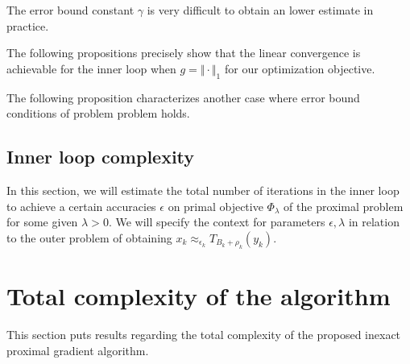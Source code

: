 \documentclass[12pt]{article}
\begin{document}
        \begin{remark}
            The error bound constant $\gamma$ is very difficult to obtain an lower estimate in practice. 
        \end{remark}
        \par
        The following propositions precisely show that the linear convergence is achievable for the inner loop when $g = \Vert \cdot\Vert_1$ for our optimization objective. 
        \begin{proposition}\label{prop:inn-loop-lin-cnvg}
            
        \end{proposition}
        The following proposition characterizes another case where error bound conditions of problem problem holds. 
        \begin{proposition}\label{prop:plq-prox-problem}
            
        \end{proposition}
    \subsection{Inner loop complexity}
        In this section, we will estimate the total number of iterations in the inner loop to achieve a certain accuracies $\epsilon$ on primal objective $\Phi_\lambda$ of the proximal problem for some given $\lambda > 0$. 
        We will specify the context for parameters $\epsilon, \lambda$ in relation to the outer problem of obtaining $x_k \approx_{\epsilon_k} T_{B_k + \rho_k}(y_k)$. 


\section{Total complexity of the algorithm}
    This section puts results regarding the total complexity of the proposed inexact proximal gradient algorithm. 




\end{document}
